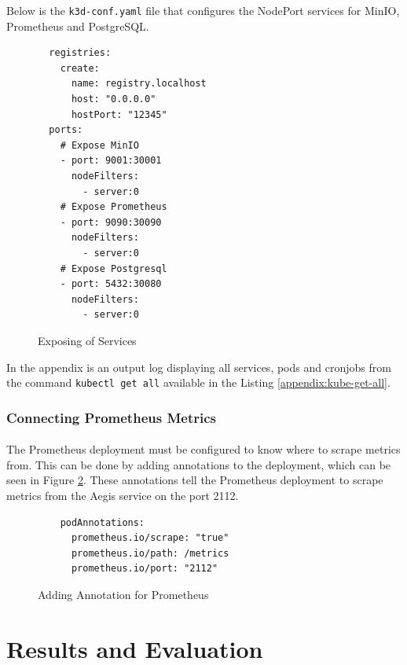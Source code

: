 \documentclass[12pt, conference, final, a4paper, onecolumn, compsoc]{IEEEtran}
\begin{document}
Below is the \texttt{k3d-conf.yaml} file that configures the NodePort services
for MinIO, Prometheus and PostgreSQL.

\begin{figure}[H]
\begin{lstlisting}
  registries:
    create:
      name: registry.localhost
      host: "0.0.0.0"
      hostPort: "12345"
  ports:
    # Expose MinIO
    - port: 9001:30001
      nodeFilters:
        - server:0
    # Expose Prometheus
    - port: 9090:30090
      nodeFilters:
        - server:0
    # Expose Postgresql
    - port: 5432:30080
      nodeFilters:
        - server:0
\end{lstlisting}
  \caption{Exposing of Services}
  \label{fig:expose-services}
\end{figure}

In the appendix is an output log displaying all services, pods and cronjobs
from the command \texttt{kubectl get all} available in the Listing \ref{appendix:kube-get-all}.

\subsubsection*{Connecting Prometheus Metrics}
\paragraph{}
The Prometheus deployment must be configured to know where to scrape metrics
from. This can be done by adding annotations to the deployment, which can be
seen in Figure \ref{fig:prometheus-annotations}. These annotations tell the
Prometheus deployment to scrape metrics from the Aegis service on the port 2112.

\begin{figure}[H]
\begin{lstlisting}
    podAnnotations:
      prometheus.io/scrape: "true"
      prometheus.io/path: /metrics
      prometheus.io/port: "2112"
\end{lstlisting}
  \caption{Adding Annotation for Prometheus}
  \label{fig:prometheus-annotations}
\end{figure}

\section{Results and Evaluation}
\end{document}
